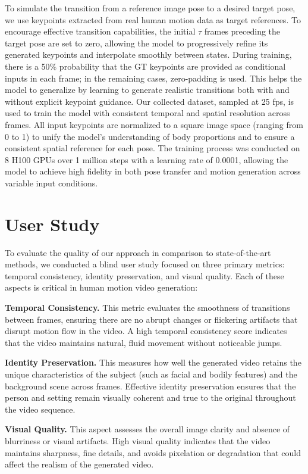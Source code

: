 To simulate the transition from a reference image pose to a desired target pose, we use keypoints extracted from real human motion data as target references. To encourage effective transition capabilities, the initial $\tau$ frames preceding the target pose are set to zero, allowing the model to progressively refine its generated keypoints and interpolate smoothly between states. During training, there is a 50\% probability that the GT keypoints are provided as conditional inputs in each frame; in the remaining cases, zero-padding is used. This helps the model to generalize by learning to generate realistic transitions both with and without explicit keypoint guidance. Our collected dataset, sampled at 25 fps, is used to train the model with consistent temporal and spatial resolution across frames. All input keypoints are normalized to a square image space (ranging from 0 to 1) to unify the model’s understanding of body proportions and to ensure a consistent spatial reference for each pose. The training process was conducted on 8 H100 GPUs over 1 million steps with a learning rate of 0.0001, allowing the model to achieve high fidelity in both pose transfer and motion generation across variable input conditions.

\section{User Study}

To evaluate the quality of our approach in comparison to state-of-the-art methods, we conducted a blind user study focused on three primary metrics: temporal consistency, identity preservation, and visual quality. Each of these aspects is critical in human motion video generation:

\noindent\textbf{Temporal Consistency.} This metric evaluates the smoothness of transitions between frames, ensuring there are no abrupt changes or flickering artifacts that disrupt motion flow in the video. A high temporal consistency score indicates that the video maintains natural, fluid movement without noticeable jumps.
  
\noindent\textbf{Identity Preservation.} This measures how well the generated video retains the unique characteristics of the subject (such as facial and bodily features) and the background scene across frames. Effective identity preservation ensures that the person and setting remain visually coherent and true to the original throughout the video sequence.

\noindent\textbf{Visual Quality.} This aspect assesses the overall image clarity and absence of blurriness or visual artifacts. High visual quality indicates that the video maintains sharpness, fine details, and avoids pixelation or degradation that could affect the realism of the generated video.

